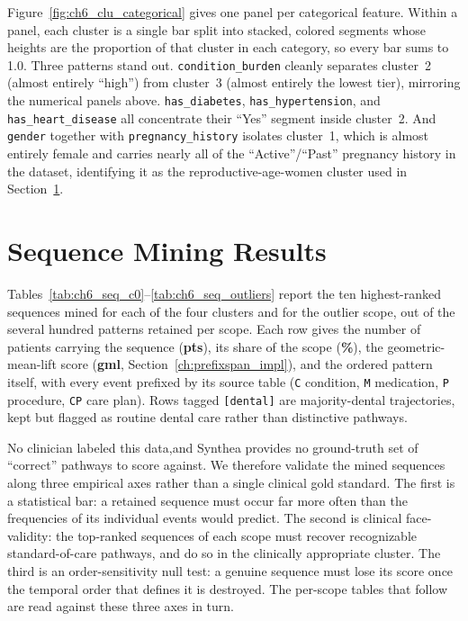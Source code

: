 Figure~\ref{fig:ch6_clu_categorical} gives one panel per categorical feature. Within a panel, each cluster is a single bar split into stacked, colored segments whose heights are the proportion of that cluster in each category, so every bar sums to 1.0. Three patterns stand out. \texttt{condition\_burden} cleanly separates cluster~2 (almost entirely ``high'') from cluster~3 (almost entirely the lowest tier), mirroring the numerical panels above. \texttt{has\_diabetes}, \texttt{has\_hypertension}, and \texttt{has\_heart\_disease} all concentrate their ``Yes'' segment inside cluster~2. And \texttt{gender} together with \texttt{pregnancy\_history} isolates cluster~1, which is almost entirely female and carries nearly all of the ``Active''/``Past'' pregnancy history in the dataset, identifying it as the reproductive-age-women cluster used in Section~\ref{ch:results_sequences}.

\label{ch:cluster_results}

\section{Sequence Mining Results}
\label{ch:results_sequences}

Tables~\ref{tab:ch6_seq_c0}--\ref{tab:ch6_seq_outliers} report the ten highest-ranked sequences mined for each of the four clusters and for the outlier scope, out of the several hundred patterns retained per scope. Each row gives the number of patients carrying the sequence (\textbf{pts}), its share of the scope (\textbf{\%}), the geometric-mean-lift score (\textbf{gml}, Section~\ref{ch:prefixspan_impl}), and the ordered pattern itself, with every event prefixed by its source table (\texttt{C} condition, \texttt{M} medication, \texttt{P} procedure, \texttt{CP} care plan). Rows tagged \texttt{[dental]} are majority-dental trajectories, kept but flagged as routine dental care rather than distinctive pathways.

No clinician labeled this data,and Synthea provides no ground-truth set of ``correct'' pathways to score against. We therefore validate the mined sequences along three empirical axes rather than a single clinical gold standard. The first is a statistical bar: a retained sequence must occur far more often than the frequencies of its individual events would predict. The second is clinical face-validity: the top-ranked sequences of each scope must recover recognizable standard-of-care pathways, and do so in the clinically appropriate cluster. The third is an order-sensitivity null test: a genuine sequence must lose its score once the temporal order that defines it is destroyed. The per-scope tables that follow are read against these three axes in turn.

